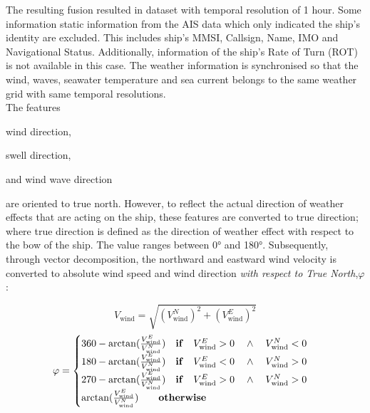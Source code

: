 The resulting fusion resulted in dataset with temporal resolution of 1 hour. Some information static information from the AIS data which only indicated the ship's identity are excluded. This includes ship's MMSI, Callsign, Name, IMO and Navigational Status. Additionally, information of the ship's Rate of Turn (ROT) is not available in this case. The weather information is synchronised so that the wind, waves, seawater temperature and sea current belongs to the same weather grid with same temporal resolutions.\\ 

The features \begin{enumerate*}[label={(\arabic*)}]
    \item wind direction,
    \item swell direction,
    \item and wind wave direction
\end{enumerate*} are oriented to true north. However, to reflect the actual direction of weather effects that are acting on the ship, these features are converted to true direction; where true direction is defined as the direction of weather effect with respect to the bow of the ship. The value ranges between 0° and 180°. Subsequently, through vector decomposition, the northward and eastward wind velocity is converted to absolute wind speed and wind direction \emph{with respect to True North},$\varphi$:

\begin{equation}\label{eqn:vwindabs}
    V_{\text{wind}} = \sqrt{(V_{\text{wind}}^N)^2 + (V_{\text{wind}}^E)^2} 
\end{equation}
\begin{equation}\label{eqn:winddir}
    \varphi = 
    \begin{cases}
        360 - \arctan(\frac{V_{\text{wind}}^E}{V_{\text{wind}}^N}) \quad \text{\textbf{if}} \quad V_{\text{wind}}^E > 0 \quad \wedge \quad V_{\text{wind}}^N < 0 \\ 
        180 - \arctan(\frac{V_{\text{wind}}^E}{V_{\text{wind}}^N}) \quad \text{\textbf{if}} \quad V_{\text{wind}}^E < 0 \quad \wedge \quad V_{\text{wind}}^N > 0 \\ 
        270 - \arctan(\frac{V_{\text{wind}}^E}{V_{\text{wind}}^N}) \quad \text{\textbf{if}} \quad V_{\text{wind}}^E > 0 \quad \wedge \quad V_{\text{wind}}^N > 0 \\
        \arctan(\frac{V_{\text{wind}}^E}{V_{\text{wind}}^N}) \qquad \text{\textbf{otherwise}} 
    \end{cases}   
\end{equation}

